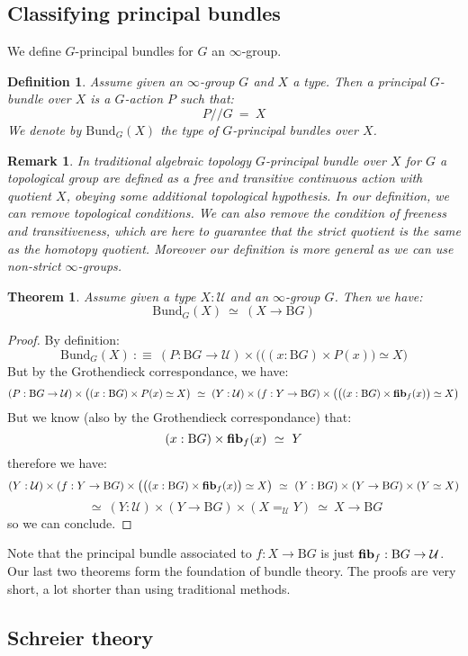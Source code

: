 \documentclass{article}
\newcommand{\sse}[1]{\medbreak \subsection{#1}}
\newcommand{\U}{{\mathcal U}}
\renewcommand{\r}{\rightarrow}
\newcommand{\fib}{\mathrm{\bf fib}}
\newcommand{\B}{\mathrm{B}}
\newtheorem{definition}{Definition}
\newtheorem{theorem}{Theorem}
\newtheorem{remark}{Remark}
\begin{document}
\sse{Classifying principal bundles}

We define $G$-principal bundles for $G$ an $\infty$-group.

\begin{definition}
Assume given an $\infty$-group $G$ and $X$ a type. Then a principal $G$-bundle over $X$ is a $G$-action $P$ such that:
\[P//G \ = \ X\]
We denote by $\mathrm{Bund}_G(X)$ the type of $G$-principal bundles over $X$.
\end{definition}

\begin{remark}
In traditional algebraic topology $G$-principal bundle over $X$ for $G$ a topological group are defined as a free and transitive continuous action with quotient $X$, obeying some additional topological hypothesis. In our definition, we can remove topological conditions. We can also remove the condition of freeness and transitiveness, which are here to guarantee that the strict quotient is the same as the homotopy quotient. Moreover our definition is more general as we can use non-strict $\infty$-groups.
\end{remark}

\begin{theorem}
Assume given a type $X:\U$ and an $\infty$-group $G$. Then we have:
\[\mathrm{Bund}_G(X)\ \simeq\ (X\r \B G)\]
\end{theorem}
\begin{proof}
By definition:
\[\mathrm{Bund}_G(X)\ :\equiv\ (P : \B G \r \U)\times \big( \big((x:\B G)\times P(x)\big) \simeq X \big)\]
But by the Grothendieck correspondance, we have:
 \[(P : \B G \r \U)\times \big((x:\B G)\times P(x) \simeq X \big) \ \simeq\ (Y:\U)\times (f:Y\r \B G) \times \big(\big((x:\B G)\times \fib_f(x)\big) \simeq X\big)\]
 But we know (also by the Grothendieck correspondance) that:  
 \[(x:\B G)\times \fib_f(x)\ \simeq\ Y\]
 therefore we have:
 \[(Y:\U)\times (f:Y\r \B G) \times \big(\big((x:\B G)\times \fib_f(x)\big) \simeq X\big) \ \simeq \ (Y:\B G)\times  (Y\r \B G)\times (Y \simeq X)\]
\[\ \simeq\ (Y:\U)\times (Y\r \B G)\times (X=_\U Y)\ \simeq \ X\r \B G\]
 so we can conclude.
\end{proof}

Note that the principal bundle associated to $f:X\r \B G$ is just $\fib_f : \B G \r \U$. Our last two theorems form the foundation of bundle theory. The proofs are very short, a lot shorter than using traditional methods. 


\sse{Schreier theory}
\end{document}
